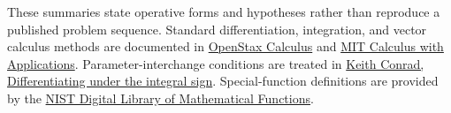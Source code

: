 \documentclass[11pt,oneside,openany]{book}
\begin{document}
These summaries state operative forms and hypotheses rather than reproduce a
published problem sequence. Standard differentiation, integration, and vector
calculus methods are documented in \href{https://openstax.org/subjects/math}{OpenStax Calculus}
and \href{https://ocw.mit.edu/ans7870/18/18.013a/textbook/index.html}{MIT Calculus with Applications}.
Parameter-interchange conditions are treated in
\href{https://kconrad.math.uconn.edu/blurbs/analysis/diffunderint.pdf}{Keith Conrad, Differentiating under the integral sign}.
Special-function definitions are provided by the \href{https://dlmf.nist.gov/}{NIST Digital Library of Mathematical Functions}.

\clearpage
{}
\begingroup
\setlength{\parskip}{3pt}\setlength{\parindent}{0pt}\setlength{\emergencystretch}{1em}
\newcommand{\QuickHeading}[1]{\par\vspace{5pt}{\sffamily\bfseries\color{QuickHeadingColor}#1\par}\nobreak\vspace{2pt}\nobreak}
\pagestyle{BookQuickReference}
\markright{}
{}
\label{quick-reference:start}
\end{document}
